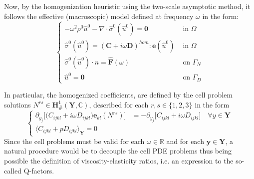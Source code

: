 Now, by the homogenization heuristic using the two-scale asymptotic method, it follows the effective (macroscopic) model defined at frequency $\omega$ in the form:
\begin{equation*}
    \left \{
    \begin{array}{cc}
        -\omega^2 \rho^{0} \hat{u}^0 - \nabla \cdot \hat{\sigma}^0(\hat{u}^0)  = \mathbf{0} & \text{ in } \Omega \\
        \hat{\sigma}^{0} (\hat{u}^0)  = (\mathbf{C} + i\omega \mathbf{D})^{hom}:\mathbf{e}(\hat{u}^0) & \text{ in } \Omega \\
        \hat{\sigma}^{0} (\hat{u}^0) \cdot n = \hat{\mathbf{F}}(\omega) & \text{ on } \Gamma_N \\
        \hat{u}^0 = \mathbf{0} & \text{ on } \Gamma_D
    \end{array}
    \right .
\end{equation*}

In particular, the homogenized coefficients, are defined by the cell problem solutions $N^{rs} \in \mathbf{H}^1_{\#}(\mathbf{Y}, \mathbb{C})$, described for each $r,s \in \{1,2,3\}$ in the form
\begin{equation*}
    \left \{
    \begin{array}{cc}
         \partial_{y_j} \big[ \big( C_{ijkl} + i\omega D_{ijkl} \big) \mathbf{e}_{kl}(N^{rs}) \big] &= - \partial_{y_j} \big[ C_{ijkl} + i\omega D_{ijkl} \big] \quad \forall y \in \mathbf{Y} \\
        \big \langle C_{ijkl} + p D_{ijkl} \big \rangle_{\mathbf{Y}}  = 0 & 
    \end{array}
    \right.
\end{equation*}
Since the cell problems must be valid for each $\omega \in \mathbb{R}$ and for each $\mathbf{y} \in \mathbf{Y}$, a natural procedure would be to decouple the cell PDE problems thus being possible the definition of viscosity-elasticity ratios, i.e. an expression to the so-called Q-factors.

